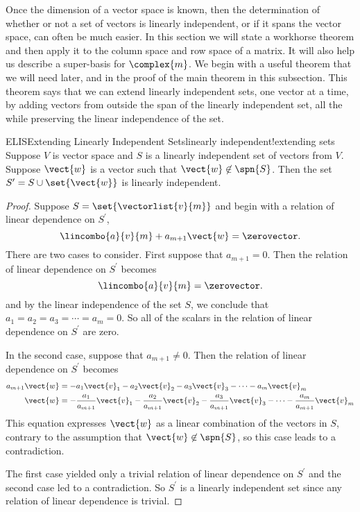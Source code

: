 %
Once the dimension of a vector space is known, then the determination of whether or not a set of vectors is linearly independent, or if it spans the vector space, can often be much easier.  In this section we will state a workhorse theorem and then apply it to the column space and row space of a matrix.  It will also help us describe a super-basis for $\complex{m}$.
%
%
We begin with a useful theorem that we will need later, and in the proof of the main theorem in this subsection.  This theorem says that we can extend linearly independent sets, one vector at a time, by adding vectors from outside the span of the linearly independent set, all the while preserving the  linear independence of the set.
%
\begin{theorem}{ELIS}{Extending Linearly Independent Sets}{linearly independent!extending sets}
Suppose $V$ is vector space and $S$ is a linearly independent set of vectors from $V$.  Suppose $\vect{w}$ is a vector such that $\vect{w}\not\in\spn{S}$.  Then the set $S^\prime=S\cup\set{\vect{w}}$ is linearly independent.
\end{theorem}
%
\begin{proof}
Suppose $S=\set{\vectorlist{v}{m}}$ and begin with a relation of linear dependence on $S^\prime$,
%
\begin{equation*}
\lincombo{a}{v}{m}+a_{m+1}\vect{w}=\zerovector.
\end{equation*}
%
There are two cases to consider.  First suppose that $a_{m+1}=0$.  Then the relation of linear dependence on $S^\prime$ becomes
%
\begin{equation*}
\lincombo{a}{v}{m}=\zerovector.
\end{equation*}
%
and by the linear independence of the set $S$, we conclude that $a_1=a_2=a_3=\cdots=a_m=0$.  So all of the scalars in the relation of linear dependence on $S^\prime$ are zero.\par
%
In the second case, suppose that $a_{m+1}\neq 0$.    Then the relation of linear dependence on $S^\prime$ becomes
%
\begin{align*}
a_{m+1}\vect{w}&=-a_1\vect{v}_1-a_2\vect{v}_2-a_3\vect{v}_3-\cdots-a_m\vect{v}_m\\
\vect{w}&=-\frac{a_1}{a_{m+1}}\vect{v}_1-\frac{a_2}{a_{m+1}}\vect{v}_2-\frac{a_3}{a_{m+1}}\vect{v}_3-\cdots-\frac{a_m}{a_{m+1}}\vect{v}_m
\end{align*}
%
This equation expresses $\vect{w}$ as a linear combination of the vectors in $S$, contrary to the assumption that $\vect{w}\not\in\spn{S}$, so this case leads to a contradiction.\par
%
The first case yielded only a trivial relation of linear dependence on $S^\prime$ and the second case led to a contradiction.  So $S^\prime$ is a linearly independent set since any relation of linear dependence is trivial.
%
\end{proof}
